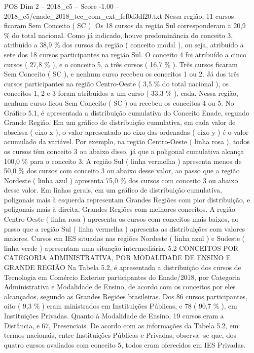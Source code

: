 \begin{textsample}{POS Dim 2 – 2018\_c5 – Score -1.00 – 2018\_c5/enade\_2018\_tec\_com\_ext\_fef0d3df20.txt}
Nessa região, 11 cursos ficaram Sem Conceito ( SC ).
Os 18 cursos da região Sul corresponderam a 20,9 \% do total nacional.
Como já indicado, houve predominância do conceito 3, atribuído a 38,9 \% dos cursos da região ( conceito modal ), ou seja, atribuído a sete dos 18 cursos participantes na região Sul.
O conceito 4 foi atribuído a cinco cursos ( 27,8 \% ), e o conceito 5, a três cursos ( 16,7 \% ).
Três cursos ficaram Sem Conceito ( SC ), e nenhum curso recebeu os conceitos 1 ou 2.
Já dos três cursos participantes na região Centro-Oeste ( 3,5 \% do total nacional ), os conceitos 1, 2 e 3 foram atribuídos a um curso ( 33,3 \% ), cada.
Nessa região, nenhum curso ficou Sem Conceito ( SC ) ou recebeu os conceitos 4 ou 5.
No Gráfico 5.1, é apresentada a distribuição cumulativa do Conceito Enade, segundo Grande Região.
Em um gráfico de distribuição cumulativa, em cada valor de abscissa ( eixo x ), o valor apresentado no eixo das ordenadas ( eixo y ) é o valor acumulado da variável.
Por exemplo, na região Centro-Oeste ( linha rosa ), todos os cursos têm conceito 3 ou abaixo disso, já que a poligonal cumulativa alcança 100,0 \% para o conceito 3.
A região Sul ( linha vermelha ) apresenta menos de 50,0 \% dos cursos com conceito 3 ou abaixo desse valor, ao passo que a região Nordeste ( linha azul ) apresenta 75,0 \% dos cursos com conceito 3 ou abaixo desse valor.
Em linhas gerais, em um gráfico de distribuição cumulativa, poligonais mais à esquerda representam Grandes Regiões com pior distribuição, e poligonais mais à direita, Grandes Regiões com melhores conceitos.
A região Centro-Oeste ( linha rosa ) apresenta os cursos com conceitos mais baixos, ao passo que a região Sul ( linha vermelha ) apresenta as distribuições com valores maiores.
Cursos em IES situadas nas regiões Nordeste ( linha azul ) e Sudeste ( linha verde ) apresentam uma situação intermediária. 5.2 CONCEITOS POR CATEGORIA ADMINISTRATIVA, POR MODALIDADE DE ENSINO E GRANDE REGIÃO Na Tabela 5.2, é apresentada a distribuição dos cursos de Tecnologia em Comércio Exterior participantes do Enade/2018, por Categoria Administrativa e Modalidade de Ensino, de acordo com os conceitos por eles alcançados, segundo as Grandes Regiões brasileiras.
Dos 86 cursos participantes, oito ( 9,3 \% ) eram ministrados em Instituições Públicas, e 78 ( 90,7 \% ), em Instituições Privadas.
Quanto à Modalidade de Ensino, 19 cursos eram a Distância, e 67, Presenciais.
De acordo com as informações da Tabela 5.2, em termos nacionais, entre Instituições Públicas e Privadas, observa -se que, dos quatro cursos avaliados com conceito 5, todos eram oferecidos em IES Privadas.

\end{textsample}
